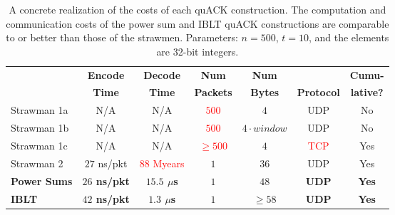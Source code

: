 \begin{table}[t]
\centering
\begin{tabular}{lcccccc}
  \toprule
  & \bf Encode & \bf Decode & \bf Num & \bf Num & \bf  & \bf Cumu- \\
  & \bf Time & \bf Time & \bf Packets & \bf Bytes & \bf Protocol & \bf lative? \\
  \midrule
  Strawman 1a & N/A & N/A & \textcolor{red}{$500$} & $4$ & UDP & No \\
  Strawman 1b & N/A & N/A & \textcolor{red}{$500$} & $4 \cdot window$ & UDP & No \\
  Strawman 1c & N/A & N/A & \textcolor{red}{$\geq 500$} & $4$ & \textcolor{red}{TCP} & Yes \\
  Strawman 2 & $27$ ns/pkt & \textcolor{red}{$88$ Myears} & $1$ & $36$ & UDP & Yes \\
  \bf \textcolor{black!50!blue}{Power Sums} & \bf \textcolor{black!50!blue}{$26$ ns/pkt} & \bf \textcolor{black!50!blue}{$15.5$ $\mu$s} & \bf \textcolor{black!50!blue}{$1$} & \bf \textcolor{black!50!blue}{$48$} & \bf \textcolor{black!50!blue}{UDP} & \bf \textcolor{black!50!blue}{Yes} \\
  \bf \textcolor{black!50!blue}{IBLT} & \bf \textcolor{black!50!blue}{$42$ ns/pkt} & \bf \textcolor{black!50!blue}{$1.3$ $\mu$s} & \bf \textcolor{black!50!blue}{$1$} & \bf \textcolor{black!50!blue}{$\geq 58$} & \bf \textcolor{black!50!blue}{UDP} & \bf \textcolor{black!50!blue}{Yes} \\
  \bottomrule
\end{tabular}
\caption{A concrete realization of the costs of each quACK construction.
The computation and communication costs of the power sum and IBLT
quACK constructions are comparable to or better than those of the strawmen.
Parameters: $n=500$, $t=10$, and the elements are 32-bit integers.}
\label{tab:quack:practical}
\end{table}
